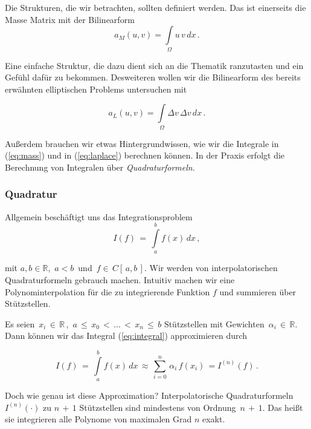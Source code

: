 Die Strukturen, die wir betrachten, sollten definiert werden. Das ist einerseits die Masse Matrix mit der Bilinearform
\begin{equation} \label{eq:mass}
a_M(u,v)= \int\limits_{\Omega} u \, v \, dx \, .
\end{equation}

Eine einfache Struktur, die dazu dient sich an die Thematik ranzutasten und ein Gefühl dafür zu bekommen. Desweiteren wollen wir die Bilinearform des bereits erwähnten elliptischen Problems untersuchen mit

\begin{equation} \label{eq:laplace}
a_L(u,v) = \int\limits_{\Omega} \Delta v \, \Delta v \, dx \, .
\end{equation}

Außerdem brauchen wir etwas Hintergrundwissen, wie wir die Integrale in (\ref{eq:mass}) und in (\ref{eq:laplace}) berechnen können. In der Praxis erfolgt die Berechnung von Integralen über   \textit{Quadraturformeln}.

\subsubsection{Quadratur}

Allgemein beschäftigt uns das Integrationsproblem
\begin{equation} \label{eq:integral}
I(f) \, = \, \int\limits_{a}^{b} f(x) \, dx \, ,
\end{equation}

mit $a,b \in \mathbb{R}$, $\, a < b \, $ und $\, f \in \, C[ \, a,b \, ] $.
Wir werden von interpolatorischen Quadraturformeln gebrauch machen. Intuitiv machen wir eine Polynominterpolation für die zu integrierende Funktion $f$ und summieren über Stützstellen.

Es seien $\, x_i \, \in \, \mathbb{R} \,$, $\, a \, \leq \, x_0 \, < \, \dots \, < \, x_n \, \leq \, b$ Stützstellen mit Gewichten $\, \alpha_i \, \in \, \mathbb{R}$. Dann können wir das Integral (\ref{eq:integral}) approximieren durch

\begin{equation} \label{eq:integral}
I(f) \, = \, \int\limits_{a}^{b} f(x) \, dx \, \approx \, \sum\limits_{i=0}^{n} \, \alpha_i \, f(x_i) \, = I^{(n)}(f) \, .
\end{equation}

Doch wie genau ist diese Approximation? Interpolatorische Quadraturformeln $I^{(n)}(\cdot)$ zu $n \, + \, 1$ Stützstellen sind mindestens von Ordnung $\, n \, + \,1$. Das heißt sie integrieren alle Polynome von maximalen Grad $n$ exakt.

